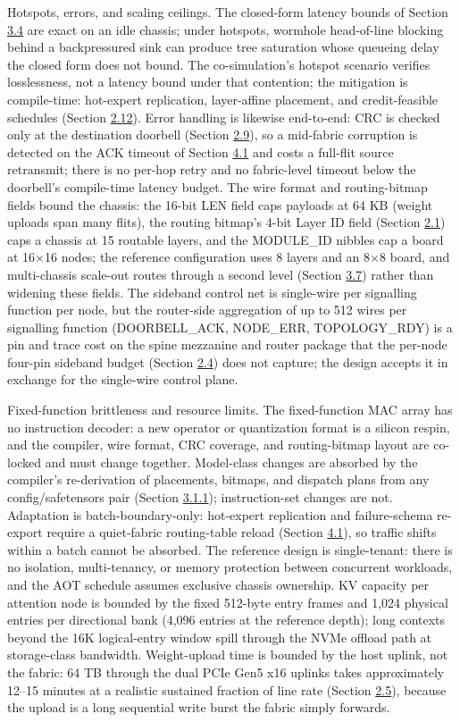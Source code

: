 \documentclass[10pt,twocolumn]{article}
\begin{document}
Hotspots, errors, and scaling ceilings. The closed-form latency bounds of Section \hyperref[sec:3.4]{3.4} are exact on an idle chassis; under hotspots, wormhole head-of-line blocking behind a backpressured sink can produce tree saturation whose queueing delay the closed form does not bound. The co-simulation's hotspot scenario verifies losslessness, not a latency bound under that contention; the mitigation is compile-time: hot-expert replication, layer-affine placement, and credit-feasible schedules (Section \hyperref[sec:2.12]{2.12}). Error handling is likewise end-to-end: CRC is checked only at the destination doorbell (Section \hyperref[sec:2.9]{2.9}), so a mid-fabric corruption is detected on the ACK timeout of Section \hyperref[sec:4.1]{4.1} and costs a full-flit source retransmit; there is no per-hop retry and no fabric-level timeout below the doorbell's compile-time latency budget. The wire format and routing-bitmap fields bound the chassis: the 16-bit LEN field caps payloads at 64 KB (weight uploads span many flits), the routing bitmap's 4-bit Layer ID field (Section \hyperref[sec:2.1]{2.1}) caps a chassis at 15 routable layers, and the MODULE\_ID nibbles cap a board at 16$\times$16 nodes; the reference configuration uses 8 layers and an 8$\times$8 board, and multi-chassis scale-out routes through a second level (Section \hyperref[sec:3.7]{3.7}) rather than widening these fields. The sideband control net is single-wire per signalling function per node, but the router-side aggregation of up to 512 wires per signalling function (DOORBELL\_ACK, NODE\_ERR, TOPOLOGY\_RDY) is a pin and trace cost on the spine mezzanine and router package that the per-node four-pin sideband budget (Section \hyperref[sec:2.4]{2.4}) does not capture; the design accepts it in exchange for the single-wire control plane.

Fixed-function brittleness and resource limits. The fixed-function MAC array has no instruction decoder: a new operator or quantization format is a silicon respin, and the compiler, wire format, CRC coverage, and routing-bitmap layout are co-locked and must change together. Model-class changes are absorbed by the compiler's re-derivation of placements, bitmaps, and dispatch plans from any config/safetensors pair (Section \hyperref[sec:3.1.1]{3.1.1}); instruction-set changes are not. Adaptation is batch-boundary-only: hot-expert replication and failure-schema re-export require a quiet-fabric routing-table reload (Section \hyperref[sec:4.1]{4.1}), so traffic shifts within a batch cannot be absorbed. The reference design is single-tenant: there is no isolation, multi-tenancy, or memory protection between concurrent workloads, and the AOT schedule assumes exclusive chassis ownership. KV capacity per attention node is bounded by the fixed 512-byte entry frames and 1,024 physical entries per directional bank (4,096 entries at the reference depth); long contexts beyond the 16K logical-entry window spill through the NVMe offload path at storage-class bandwidth. Weight-upload time is bounded by the host uplink, not the fabric: 64 TB through the dual PCIe Gen5 x16 uplinks takes approximately 12--15 minutes at a realistic sustained fraction of line rate (Section \hyperref[sec:2.5]{2.5}), because the upload is a long sequential write burst the fabric simply forwards.
\end{document}
